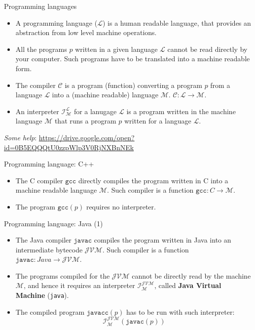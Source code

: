 \documentclass{beamer}
\begin{document}
\begin{frame}{Programming languages}
	\begin{itemize}
		\item A programming language ($\mathcal{L}$) is a human readable language, that provides an abstraction from low level machine operations.
		\item All the programs $p$ written in a given language $\mathcal{L}$ cannot be read directly by your computer. Such programs have to be translated into a machine readable form.
		\item The compiler $\mathcal{C}$ is a program (function) converting a program $p$ from a language $\mathcal{L}$ into a (machine readable) language $\mathcal{M}$. $\mathcal{C}\colon \mathcal{L}\to \mathcal{M}$.
		\item An interpreter $\mathcal{I}_{\mathcal{M}}^{\mathcal{L}}$ for a lanugage $\mathcal{L}$ is a program written in the machine language $\mathcal{M}$ that runs a program $p$ written for a language $\mathcal{L}$.
	\end{itemize}
\begin{center}
\textit{Some help}: \url{https://drive.google.com/open?id=0B5EQQQtU0zzpWlp3V0RjNXBnNEk}
\end{center}
\end{frame}

\begin{frame}{Programming language: C++}
	\begin{itemize}
		\item The C compiler $\texttt{gcc}$ directly compiles the program written in C into a machine readable language $\mathcal{M}$. Such compiler is a function $\texttt{gcc}\colon C\to \mathcal{M}$.
		\item The program $\texttt{gcc}(p)$ requires no interpreter.
	\end{itemize}
\end{frame}

\begin{frame}{Programming language: Java (1)}
	\begin{itemize}
		\item The Java compiler $\texttt{javac}$ compiles the program written in Java into an intermediate bytecode $\mathcal{JVM}$. Such compiler is a function $\texttt{javac}\colon Java\to \mathcal{JVM}$.
		\item The programs compiled for the $\mathcal{JVM}$ cannot be directly read by the machine $\mathcal{M}$, and hence it requires an interpreter $\mathcal{I}_{\mathcal{M}}^{\mathcal{JVM}}$, called \textbf{Java Virtual Machine} (\texttt{java}).
		\item The compiled program $\texttt{javacc}(p)$ has to be run with such interpreter:
		\[\mathcal{I}_{\mathcal{M}}^{\mathcal{JVM}}(\texttt{javac}(p))\]
	\end{itemize}
\end{frame}
\end{document}
